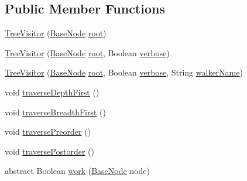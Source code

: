 \subsection*{Public Member Functions}
\begin{DoxyCompactItemize}
\item 
\hyperlink{classit_1_1emarolab_1_1cagg_1_1core_1_1BaseNode_1_1TreeVisitor_a763553888a07c4e23298995f2a4e8ef4}{Tree\-Visitor} (\hyperlink{classit_1_1emarolab_1_1cagg_1_1core_1_1BaseNode}{Base\-Node} \hyperlink{classit_1_1emarolab_1_1cagg_1_1core_1_1BaseNode_1_1TreeVisitor_ac31e11edac71abb866fd7d113a2bb017}{root})
\item 
\hyperlink{classit_1_1emarolab_1_1cagg_1_1core_1_1BaseNode_1_1TreeVisitor_aff65c0417f36e818e146a3e8f621a5f7}{Tree\-Visitor} (\hyperlink{classit_1_1emarolab_1_1cagg_1_1core_1_1BaseNode}{Base\-Node} \hyperlink{classit_1_1emarolab_1_1cagg_1_1core_1_1BaseNode_1_1TreeVisitor_ac31e11edac71abb866fd7d113a2bb017}{root}, Boolean \hyperlink{classit_1_1emarolab_1_1cagg_1_1core_1_1BaseNode_1_1TreeVisitor_a08821e56497abdbac48f874f8946b335}{verbose})
\item 
\hyperlink{classit_1_1emarolab_1_1cagg_1_1core_1_1BaseNode_1_1TreeVisitor_a93d34f094a7d220234f605f1d097e57b}{Tree\-Visitor} (\hyperlink{classit_1_1emarolab_1_1cagg_1_1core_1_1BaseNode}{Base\-Node} \hyperlink{classit_1_1emarolab_1_1cagg_1_1core_1_1BaseNode_1_1TreeVisitor_ac31e11edac71abb866fd7d113a2bb017}{root}, Boolean \hyperlink{classit_1_1emarolab_1_1cagg_1_1core_1_1BaseNode_1_1TreeVisitor_a08821e56497abdbac48f874f8946b335}{verbose}, String \hyperlink{classit_1_1emarolab_1_1cagg_1_1core_1_1BaseNode_1_1TreeVisitor_aa7178eb73b988619412baf1d4f97b703}{walker\-Name})
\item 
void \hyperlink{classit_1_1emarolab_1_1cagg_1_1core_1_1BaseNode_1_1TreeVisitor_a1240d0291eda21a2f51d77fd7b00358c}{traverse\-Depth\-First} ()
\item 
void \hyperlink{classit_1_1emarolab_1_1cagg_1_1core_1_1BaseNode_1_1TreeVisitor_aba7ae5462458e83a3ee3d70357340635}{traverse\-Breadth\-First} ()
\item 
void \hyperlink{classit_1_1emarolab_1_1cagg_1_1core_1_1BaseNode_1_1TreeVisitor_ac0c1030028dd49f8b89f7fc314ce9d17}{traverse\-Preorder} ()
\item 
void \hyperlink{classit_1_1emarolab_1_1cagg_1_1core_1_1BaseNode_1_1TreeVisitor_aded3f354ae0ffeb60f209e720e8ae625}{traverse\-Postorder} ()
\item 
abstract Boolean \hyperlink{classit_1_1emarolab_1_1cagg_1_1core_1_1BaseNode_1_1TreeVisitor_a6171f5d4f1e5b433644ac8577209f9fb}{work} (\hyperlink{classit_1_1emarolab_1_1cagg_1_1core_1_1BaseNode}{Base\-Node} node)

\end{DoxyCompactItemize}

